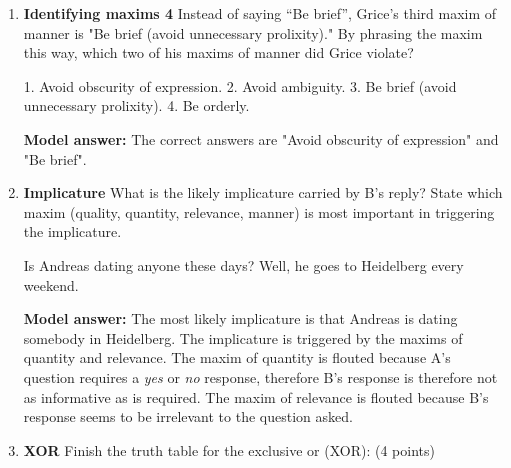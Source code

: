 \documentclass[a4,11pt]{article}
\newcommand{\6}{\mbox{$[\hspace*{-.6mm}[$}}
\newcommand{\9}{\mbox{$]\hspace*{-.6mm}]$}}
\begin{document}
\begin{enumerate}[leftmargin = 12pt]
\begin{exe}
 What did Leslie do today?
 Leslie read fifty pages and opened her book.
\end{exe}

\begin{enumerate}[noitemsep]
\item relevance
\item quantity
\item quality
\item manner
\end{enumerate}

{ \bf Model answer:} The  correct answer is the maxim of manner, since the contribution is not orderly: you need to open the book to be able to read it.

\item  { \bf Identifying maxims 4}  Instead of saying “Be brief”, Grice's third maxim of manner is "Be brief (avoid unnecessary prolixity)." By phrasing the maxim this way, which two of his maxims of manner did Grice violate?

\begin{enumerate}
1. Avoid obscurity of expression.
2. Avoid ambiguity.
3. Be brief (avoid unnecessary prolixity). 4. Be orderly.
\end{enumerate}

{ \bf Model answer:} The correct answers are "Avoid obscurity of expression" and  "Be brief". 


\item  { \bf Implicature}  What is the likely implicature carried by B's reply? State which maxim (quality, quantity, relevance, manner) is most important in triggering the implicature.

\begin{exe}
 Is Andreas dating anyone these days?
 Well, he goes to Heidelberg every weekend.
\end{exe}

{ \bf Model answer:} The most likely implicature is that Andreas is dating somebody in Heidelberg. The implicature is triggered by the maxims of quantity and relevance. The maxim of quantity is flouted because A's question requires a \textit{yes} or \textit{no} response, therefore B's response is therefore not as informative as is required. The maxim of relevance is flouted because B's response seems to be irrelevant to the question asked.


\item { \bf  XOR} Finish the truth table for the exclusive or (XOR): (4 points)


\end{enumerate}
\end{document}
